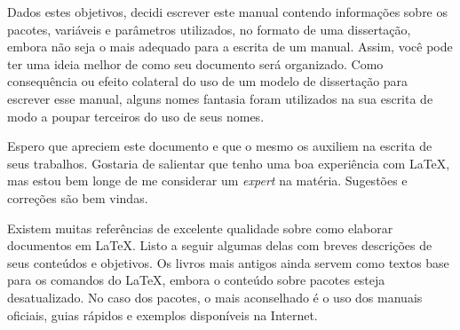 Dados estes objetivos, decidi escrever este manual contendo informações sobre os pacotes, variáveis e parâmetros utilizados, no formato de uma dissertação, embora não seja o mais adequado para a escrita de um manual. Assim, você pode ter uma ideia melhor de como seu documento será organizado. Como consequência ou efeito colateral do uso de um modelo de dissertação para escrever esse manual, alguns nomes fantasia foram utilizados na sua escrita de modo a poupar terceiros do uso de seus nomes.

Espero que apreciem este documento e que o mesmo os auxiliem na escrita de seus trabalhos. Gostaria de salientar que tenho uma boa experiência com \LaTeX , mas estou bem longe de me considerar um \textit{expert} na matéria. Sugestões e correções são bem vindas.

Existem muitas referências de excelente qualidade sobre como elaborar documentos em \LaTeX . Listo a seguir algumas delas com breves descrições de seus conteúdos e objetivos. Os livros mais antigos ainda servem como textos base para os comandos do \LaTeX{}, embora o conteúdo sobre pacotes esteja desatualizado. No caso dos pacotes, o mais aconselhado é o uso dos manuais oficiais, guias rápidos e exemplos disponíveis na Internet.

